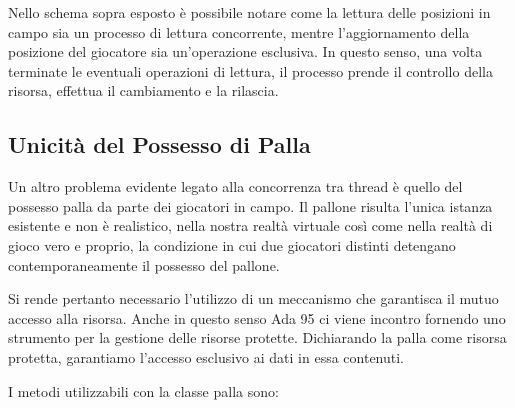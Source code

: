 \documentclass[aps,letterpaper,10pt]{article}
\begin{document}
Nello schema sopra esposto \`e possibile notare come la lettura delle posizioni in campo sia un processo di lettura
concorrente, mentre l'aggiornamento della posizione del giocatore sia un'operazione esclusiva. In questo senso, una
volta terminate le eventuali operazioni di lettura, il processo prende il controllo della risorsa, effettua il
cambiamento e la rilascia. \vspace{3mm}

\subsection{Unicit\`a del Possesso di Palla}
\label{possessopalla}

Un altro problema evidente legato alla concorrenza tra thread \`e quello del possesso palla da parte dei giocatori in
campo. Il pallone risulta l'unica istanza esistente e non \`e realistico, nella nostra realt\`a virtuale cos\`i come
nella realt\`a di gioco vero e proprio, la condizione in cui due giocatori distinti detengano contemporaneamente il
possesso del pallone. \vspace{3mm}

Si rende pertanto necessario l'utilizzo di un meccanismo che garantisca il mutuo accesso alla risorsa. Anche in questo
senso Ada 95 ci viene incontro fornendo uno strumento per la gestione delle risorse protette. Dichiarando la palla come
risorsa protetta, garantiamo l'accesso esclusivo ai dati in essa contenuti. \vspace{3mm}

I metodi utilizzabili con la classe palla sono:
\end{document}
